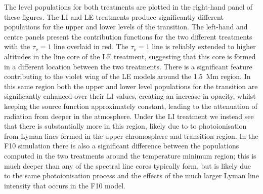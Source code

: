 The level populations for both treatments are plotted in the right-hand panel of these figures.
The LI and LE treatments produce significantly different populations for the upper and lower levels of the \CaLine{} transition.
The left-hand and centre panels present the contribution functions for the two different treatments with the $\tau_\nu=1$ line overlaid in red.
The $\tau_\nu=1$ line is reliably extended to higher altitudes in the line core of the LE treatment, suggesting that this core is formed in a different location between the two treatments.
There is a significant feature contributing to the violet wing of the LE models around the \SI{1.5}{\mega\metre} region.
In this same region both the upper and lower level populations for the \CaLine{} transition are significantly enhanced over their LI values, creating an increase in opacity, whilst keeping the source function approximately constant, leading to the attenuation of radiation from deeper in the atmosphere.
Under the LI treatment we instead see that there is substantially more \Caiii{} in this region, likely due to \Caii{} to \Caiii{} photoionisation from Lyman lines formed in the upper chromosphere and transition region.
In the F10 simulation there is also a significant difference between the \Caiii{} populations computed in the two treatments around the temperature minimum region; this is much deeper than any of the \Caii{} spectral line cores typically form, but is likely due to the same photoionisation process and the effects of the much larger Lyman line intensity that occurs in the F10 model.

